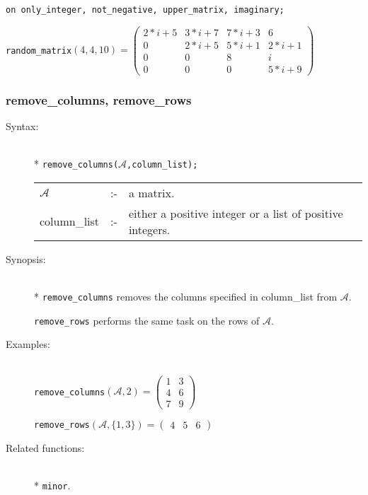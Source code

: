 \begin{description}
  \texttt{on only\_integer, not\_negative, upper\_matrix, imaginary;}

  \texttt{random\_matrix}\((4,4,10) =
  \begin{pmatrix} 2*i+5 & 3*i+7 & 7*i+3 & 6 \\ 0 & 2*i+5 &
    5*i+1 & 2*i+1 \\ 0 & 0 & 8 & i \\ 0 & 0 & 0& 5*i+9
  \end{pmatrix}\)
\end{description}


\subsubsection{remove\_columns, remove\_rows}
\label{linalg:remove_columns}

\begin{description}
\item[Syntax:]\mbox{}\\*
\texttt{remove\_columns($\mathcal{A}$,column\_list);}\\[2mm]
\begin{tabular}{l l l}
$\mathcal{A}$   &:-& a matrix. \\
column\_list &:-& either a positive integer or a list of
                  positive integers.
\end{tabular}

\item[Synopsis:]\mbox{}\\*
\texttt{remove\_columns} removes the columns specified in
                column\_list from $\mathcal{A}$.

\texttt{remove\_rows} performs the same task on the rows
                of $\mathcal{A}$.

\item[Examples:]\mbox{}\\
\texttt{remove\_columns}\((\mathcal{A},2) =
        \begin{pmatrix} 1 & 3 \\ 4 & 6 \\ 7 & 9  \end{pmatrix}\)

\texttt{remove\_rows}\((\mathcal{A},\{1,3\}) =
        \begin{pmatrix} 4 & 5 & 6 \end{pmatrix}\)

\item[Related functions:]\mbox{}\\*
\texttt{minor}.
\end{description}



